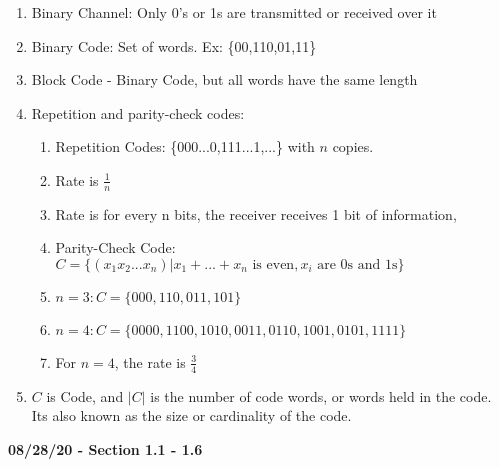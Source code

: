 \documentclass[11pt]{article}
\newcommand{\skipline}{\vspace{\baselineskip}}
\begin{document}
\begin{enumerate}
\begin{enumerate}
				\item Binary Channel: Only 0's or 1s are transmitted or received over it
				\item Binary Code: Set of words. Ex: \{00,110,01,11\}
				\item Block Code - Binary Code, but all words have the same length
				\item Repetition and parity-check codes: 
					\begin{enumerate}
						\item Repetition Codes: \{000...0,111...1,...\} with $n$ copies.
						\item Rate is $\frac{1}{n}$
						\item Rate is for every n bits, the receiver receives 1 bit of information, 
						\item Parity-Check Code: $C = \{(x_1 x_2 ... x_n)|x_1 + ... + x_n \text{ is even}, x_i \text{ are 0s and 1s}\}$
						\item $n = 3: C = \{000,110,011,101\}$
						\item $n = 4: C = \{0000, 1100 , 1010, 0011, 0110, 1001, 0101, 1111\}$
						\item For $n = 4$, the rate is $\frac{3}{4}$ 
					\end{enumerate}
				\item $C$ is Code, and $|C|$ is the number of code words, or words held in the code. Its also known as the size or cardinality of the code.
			\end{enumerate}
	\end{enumerate}
	\skipline
	\textbf{08/28/20 - Section 1.1 - 1.6}
\end{document}
